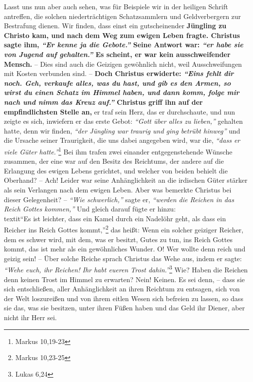 Lasst uns nun aber auch sehen, was für Beispiele wir in der heiligen Schrift
antreffen, die solchen niederträchtigen
Schatzsammlern und Geldverbergern zur
Bestrafung dienen. Wir finden, dass einst ein gutscheinender
\textbf{Jüngling zu Christo
kam, und nach dem Weg zum ewigen Leben fragte. Christus sagte ihm,
\textit{"`Er kenne ja die Gebote."'} Seine Antwort war:
\textit{"`er habe sie von Jugend auf gehalten."'} Es
scheint, er war kein ausschweifender Mensch.} -- Dies sind auch die Geizigen
gewöhnlich nicht, weil Ausschweifungen mit Kosten verbunden
sind. -- \textbf{Doch
Christus erwiderte:
\textit{"`Eins fehlt dir noch. Geh, verkaufe alles, was du hast,
und gib es den Armen, so wirst du einen Schatz im Himmel haben, und dann komm, folge mir nach
und nimm das Kreuz auf."'} Christus griff ihn auf der
empfindlichsten Stelle an,} er traf sein Herz, das er durchschaute, und nun
zeigte es sich, inwiefern er das erste Gebot: \textit{"`Gott über alles zu
lieben,"'}
gehalten hatte, denn wir finden, \textit{"`der Jüngling war traurig und ging
betrübt
hinweg"'} und die Ursache seiner Traurigkeit, die uns dabei angegeben wird, war
die,
\textit{"`dass er viele Güter hatte."'}\footnote{Markus 10,19-23}
Bei ihm trafen zwei einander entgegenstehende Wünsche zusammen, der eine war auf den Besitz des
Reichtums, der andere auf die Erlangung des ewigen Lebens
gerichtet, und
welcher von beiden behielt die Oberhand? -- Ach! Leider war seine Anhänglichkeit
an die irdischen Güter stärker als sein Verlangen nach dem ewigen Leben. Aber
was bemerkte Christus bei dieser Gelegenheit? -- \textit{"`Wie schwerlich,"'}
sagte er,
\textit{"`werden die Reichen in das Reich Gottes kommen,"'} Und gleich darauf
fügte er
hinzu:\\textit{"`Es ist leichter, dass ein Kamel durch ein Nadelöhr geht, als
dass ein
Reicher ins Reich Gottes kommt,"'}\footnote{Markus 10,23-25}
das heißt: Wenn ein
solcher geiziger Reicher, dem es schwer wird, mit dem, was er besitzt, Gutes zu
tun, ins Reich Gottes kommt, das ist mehr als ein
gewöhnliches Wunder. O! Wer
wollte denn reich und geizig sein! -- Über solche Reiche sprach Christus das
Wehe aus, indem er sagte: \textit{"`Wehe euch, ihr Reichen! Ihr habt eueren
Trost
dahin."'}\footnote{Lukas 6,24}
Wie? Haben die Reichen denn keinen Trost im
Himmel zu erwarten? Nein! Keinen. Es sei denn, -- dass sie sich
entschließen,
aller Anhänglichkeit an ihren Reichtum zu entsagen, sich von der Welt
loszureißen und von ihrem eitlen Wesen sich befreien zu lassen, so dass sie das,
was sie besitzen, unter ihren Füßen haben und das Geld ihr Diener, aber nicht
ihr Herr sei.

